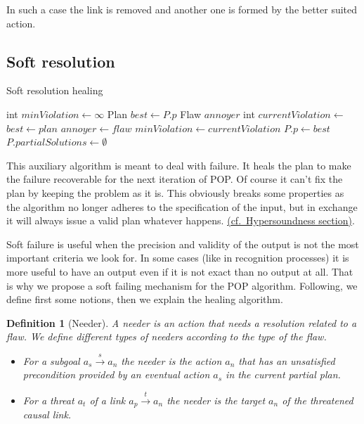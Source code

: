 \documentclass[]{article}
\newtheorem{definition}{Definition}
\begin{document}
In such a case the link is removed and another one is formed by the
better suited action.

\subsection{Soft resolution}\label{soft-resolution}

\begin{algorithm}\caption{Soft resolution healing}\label{softresolution}\begin{algorithmic}[1]

\footnotesize
{} \State int \(minViolation \gets \infty\)
\State Plan \(best \gets P.p\) \State Flaw \(annoyer\)
 \State int
\(currentViolation \gets\) 
 \State \(best \gets plan\)
\State \(annoyer \gets flaw\)
\State \(minViolation \gets currentViolation\) \EndIf
    \EndFor
    \State \(P.p \gets best\)
\State \(P.partialSolutions \gets \emptyset\)
\State {} \EndFor
\EndFunction

\end{algorithmic}\end{algorithm}

This auxiliary algorithm is meant to deal with failure. It heals the
plan to make the failure recoverable for the next iteration of POP. Of
course it can't fix the plan by keeping the problem as it is. This
obviously breaks some properties as the algorithm no longer adheres to
the specification of the input, but in exchange it will always issue a
valid plan whatever happens.
\protect\hyperlink{hypersoundness}{(cf.~Hypersoundness section)}.

Soft failure is useful when the precision and validity of the output is
not the most important criteria we look for. In some cases (like in
recognition processes) it is more useful to have an output even if it is
not exact than no output at all. That is why we propose a soft failing
mechanism for the POP algorithm. Following, we define first some
notions, then we explain the healing algorithm.

\begin{definition}[Needer]

A needer is an action that needs a resolution related to a flaw. We
define different types of needers according to the type of the flaw.

\begin{itemize}
\item
  For a subgoal \(a_s \xrightarrow{s} a_n\) the needer is the action
  \(a_n\) that has an unsatisfied precondition provided by an eventual
  action \(a_s\) in the current partial plan.
\item
  For a threat \(a_t\) of a link \(a_p \xrightarrow{t} a_n\) the needer
  is the target \(a_n\) of the threatened causal link.
\end{itemize}

\end{definition}
\end{document}
